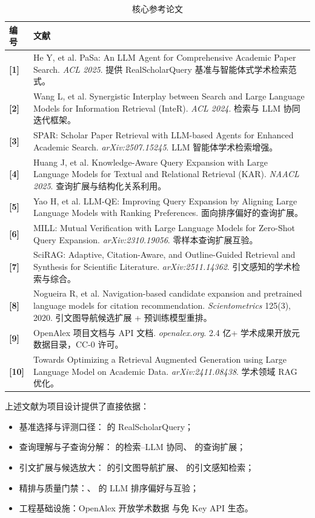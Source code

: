 \documentclass[11pt,a4paper,fontset=macnew]{ctexart}
\begin{document}
\begin{table}[H]
\centering
\caption{核心参考论文}
\label{tab:refs}
\small
\begin{tabular}{@{}lp{9.5cm}@{}}
\toprule
\textbf{编号} & \textbf{文献} \\
\midrule
\textbf{[1]} & He Y, et al. PaSa: An LLM Agent for Comprehensive Academic Paper Search. \emph{ACL 2025}. 提供 RealScholarQuery 基准与智能体式学术检索范式。 \\
\textbf{[2]} & Wang L, et al. Synergistic Interplay between Search and Large Language Models for Information Retrieval (InteR). \emph{ACL 2024}. 检索与 LLM 协同迭代框架。 \\
\textbf{[3]} & SPAR: Scholar Paper Retrieval with LLM-based Agents for Enhanced Academic Search. \emph{arXiv:2507.15245}. LLM 智能体学术检索增强。 \\
\textbf{[4]} & Huang J, et al. Knowledge-Aware Query Expansion with Large Language Models for Textual and Relational Retrieval (KAR). \emph{NAACL 2025}. 查询扩展与结构化关系利用。 \\
\textbf{[5]} & Yao H, et al. LLM-QE: Improving Query Expansion by Aligning Large Language Models with Ranking Preferences. 面向排序偏好的查询扩展。 \\
\textbf{[6]} & MILL: Mutual Verification with Large Language Models for Zero-Shot Query Expansion. \emph{arXiv:2310.19056}. 零样本查询扩展互验。 \\
\textbf{[7]} & SciRAG: Adaptive, Citation-Aware, and Outline-Guided Retrieval and Synthesis for Scientific Literature. \emph{arXiv:2511.14362}. 引文感知的学术检索与综合。 \\
\textbf{[8]} & Nogueira R, et al. Navigation-based candidate expansion and pretrained language models for citation recommendation. \emph{Scientometrics} 125(3), 2020. 引文图导航候选扩展 + 预训练模型重排。 \\
\textbf{[9]} & OpenAlex 项目文档与 API 文档. \emph{openalex.org}. 2.4 亿+ 学术成果开放元数据目录，CC-0 许可。 \\
\textbf{[10]} & Towards Optimizing a Retrieval Augmented Generation using Large Language Model on Academic Data. \emph{arXiv:2411.08438}. 学术领域 RAG 优化。 \\
\bottomrule
\end{tabular}
\end{table}

\noindent 上述文献为项目设计提供了直接依据：

\begin{itemize}
  \item 基准选择与评测口径：\cite{pasa2025} 的 RealScholarQuery；
  \item 查询理解与子查询分解：\cite{intr2024} 的检索--LLM 协同、\cite{kar2025} 的查询扩展；
  \item 引文扩展与候选放大：\cite{nogueira2020} 的引文图导航扩展、\cite{scirrag2025} 的引文感知检索；
  \item 精排与质量门禁：\cite{llmqe2024}、\cite{mill2024} 的 LLM 排序偏好与互验；
  \item 工程基础设施：OpenAlex 开放学术数据 \cite{openalex} 与免 Key API 生态。
\end{itemize}
\end{document}
